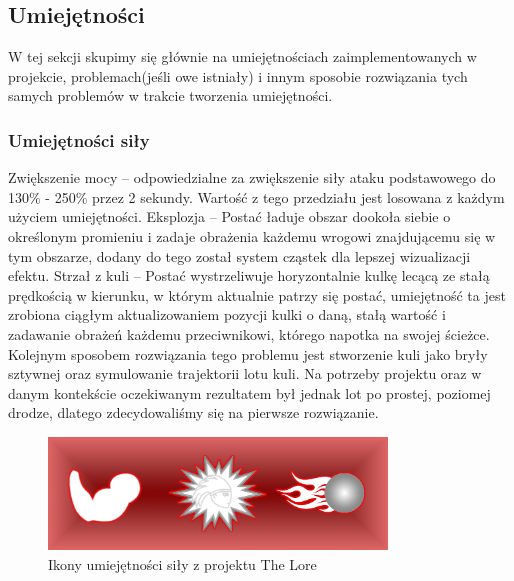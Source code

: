 \documentclass[oneside,polski,logo]{amuthesis}
\begin{document}
\subsection{Umiejętności}
W tej sekcji skupimy się głównie na umiejętnościach zaimplementowanych w projekcie, problemach(jeśli owe istniały) i innym sposobie rozwiązania tych samych problemów w trakcie tworzenia umiejętności.
\subsubsection{Umiejętności siły}
Zwiększenie mocy – odpowiedzialne za zwiększenie siły ataku podstawowego do 130\% - 250\% przez 2 sekundy. Wartość z tego przedziału jest losowana z każdym użyciem umiejętności.
Eksplozja – Postać ładuje obszar dookoła siebie o określonym promieniu i zadaje obrażenia każdemu wrogowi znajdującemu się w tym obszarze, dodany do tego został system cząstek dla lepszej wizualizacji efektu.
Strzał z kuli – Postać wystrzeliwuje horyzontalnie kulkę lecącą ze stałą prędkością w kierunku, w którym aktualnie patrzy się postać, umiejętność ta jest zrobiona ciągłym aktualizowaniem pozycji kulki o daną, stałą wartość i zadawanie obrażeń każdemu przeciwnikowi, którego napotka na swojej ścieżce. Kolejnym sposobem rozwiązania tego problemu jest stworzenie kuli jako bryły sztywnej oraz symulowanie trajektorii lotu kuli. Na potrzeby projektu oraz w danym kontekście oczekiwanym rezultatem był jednak lot po prostej, poziomej drodze, dlatego zdecydowaliśmy się na pierwsze rozwiązanie.
\begin{figure}[h]
	\centering
	\includegraphics[width=9cm]{images/kozubal/sila.png}
	\caption{Ikony umiejętności siły z projektu The Lore}
\end{figure}
\end{document}
